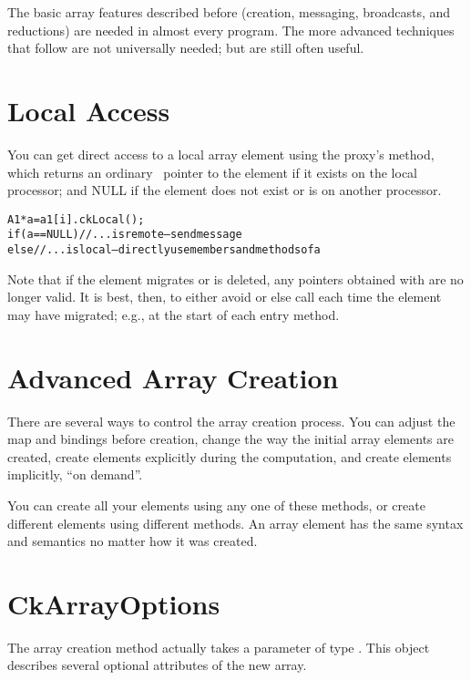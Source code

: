 The basic array features described before (creation, messaging,
broadcasts, and reductions) are needed in almost every
\charmpp{} program.  The more advanced techniques that follow
are not universally needed; but are still often useful.

\section{Local Access}

\label{ckLocal for arrays}
You can get direct access to a local array element using the
proxy's  method, which returns an ordinary \CC\ pointer
to the element if it exists on the local processor; and NULL if
the element does not exist or is on another processor.

\begin{alltt}
A1 *a=a1[i].ckLocal();
if (a==NULL) //...is remote-- send message
else //...is local-- directly use members and methods of a
\end{alltt}

Note that if the element migrates or is deleted, any pointers 
obtained with  are no longer valid.  It is best,
then, to either avoid  or else call  
each time the element may have migrated; e.g., at the start 
of each entry method.

\section{Advanced Array Creation}
\label{advanced array create}

There are several ways to control the array creation process.
You can adjust the map and bindings before creation, change
the way the initial array elements are created, create elements
explicitly during the computation, and create elements implicitly,
``on demand''.  

You can create all your elements using any one of these methods,
or create different elements using different methods.  
An array element has the same syntax and semantics no matter
how it was created.  

\section{CkArrayOptions}
\label{CkArrayOptions}

The array creation method  actually takes a parameter
of type .  This object describes several
optional attributes of the new array.

